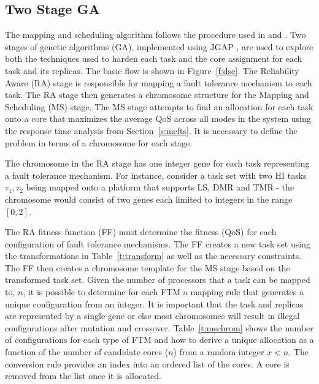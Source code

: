 \subsection{Two Stage GA}
	The mapping and scheduling algorithm follows the procedure used in \cite{bolchini2013reliability} and \cite{kang2014reliability}. 
	Two stages of genetic algorithms (GA), implemented using JGAP \cite{jgap}, are used to explore both the techniques used to harden each task and the core assignment for each task and its replicas. 
	The basic flow is shown in Figure~\ref{f:dse}. 
	The Reliability Aware (RA) stage is responsible for mapping a fault tolerance mechanism to each task. 
	The RA stage then generates a chromosome structure for the Mapping and Scheduling (MS) stage. 
	The MS stage attempts to find an allocation for each task onto a core that maximizes the average QoS across all modes in the system using the response time analysis from Section~\ref{s:mcfts}.
	It is necessary to define the problem in terms of a chromosome for each stage.
	
	
	The chromosome in the RA stage has one integer gene for each task representing a fault tolerance mechanism. 
	For instance, consider a task set with two HI tasks ${\tau_1,\tau_2}$ being mapped onto a platform that supports LS, DMR and TMR - the chromosome would consist of two genes each limited to integers in the range $[0,2]$. 
	
	The RA fitness function (FF) must determine the fitness (QoS) for each configuration of fault tolerance mechanisms. 
	The FF creates a new task set using the transformations in Table~\ref{t:transform} as well as the necessary constraints. 
	The FF then creates a chromosome template for the MS stage based on the transformed task set. 
	Given the number of processors that a task can be mapped to, $n$, it is possible to determine for each FTM a mapping rule that generates a unique configuration from an integer. 
	It is important that the task and replicas are represented by a single gene or else most chromosomes will result in illegal configurations after mutation and crossover. 
	Table~\ref{t:mschrom} shows the number of configurations for each type of FTM and how to derive a unique allocation as a function of the number of candidate cores ($n$) from a random integer $x < n$. 
	The conversion rule provides an index into an ordered list of the cores. A core is removed from the list once it is allocated.
	
